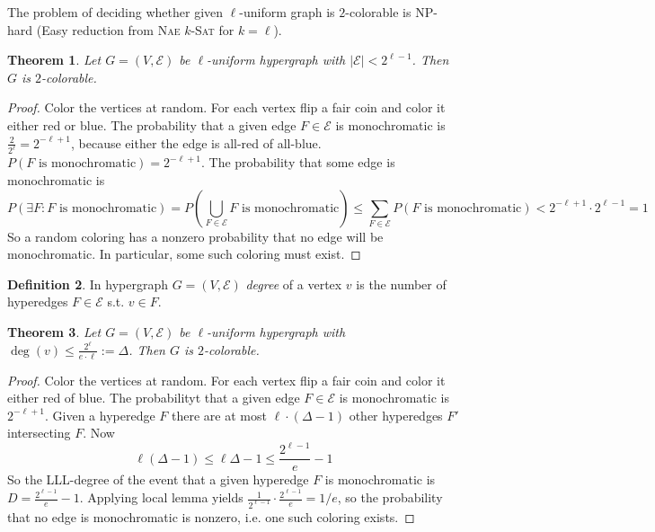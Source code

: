 \documentclass{article}
\theoremstyle{plain}
\newtheorem{thm}{Theorem}[section]
\theoremstyle{definition}
\newtheorem{defn}[thm]{Definition}
\newcommand{\naekSAT}{\textsc{Nae $k$-Sat}\xspace}
\newcommand{\NP}{\textsf{NP}\xspace}
\begin{document}
The problem of deciding whether given $\ell$-uniform graph is $2$-colorable is \NP-hard (Easy reduction from \naekSAT for $k=\ell$).

\begin{thm}
	Let $G=(V,\mathcal{E})$ be $\ell$-uniform hypergraph with $|\mathcal{E}|<2^{\ell - 1}$. Then $G$ is $2$-colorable.
\end{thm}
\begin{proof}
	Color the vertices at random. For each vertex flip a fair coin and color it either red or blue. The probability that a given edge $F\in \mathcal{E}$ is monochromatic is $\frac{2}{2^{\ell}}=2^{-\ell+1}$, because either the edge is all-red of all-blue. $P(F \text{ is monochromatic})=2^{-\ell +1}$. The probability that some edge is monochromatic is
	$$
	P(\exists F: F\text{ is monochromatic})=P(\bigcup_{F\in \mathcal{E}}{F \text{ is monochromatic}})\leq \sum_{F\in\mathcal{E}}P(F \text{ is monochromatic})<2^{-\ell + 1}\cdot 2^{\ell - 1} = 1 
	$$
	So a random coloring has a nonzero probability that no edge will be monochromatic. In particular, some such coloring must exist.
\end{proof}
\begin{defn}
	In hypergraph $G=(V,\mathcal{E})$ \textit{degree} of a vertex $v$ is the number of hyperedges $F\in\mathcal{E}$ s.t. $v\in F$.
\end{defn}
\begin{thm}
	Let $G=(V,\mathcal{E})$ be $\ell$-uniform hypergraph with $\deg(v)\leq \frac{2^{\ell}}{e\cdot \ell}:=\Delta$. Then $G$ is $2$-colorable.
\end{thm}
\begin{proof}
	Color the vertices  at random. For each vertex flip a fair coin and color it either red of blue. The probabilityt that a given edge $F\in\mathcal{E}$ is monochromatic is $2^{-\ell + 1}$. Given a hyperedge $F$ there are at most $\ell \cdot (\Delta-1)$ other hyperedges $F'$ intersecting $F$. Now
	$$
	\ell (\Delta - 1) \leq \ell \Delta - 1 \leq \frac{2^{\ell - 1}}{e}-1
	$$
	So the LLL-degree of the event that a given hyperedge $F$ is monochromatic is $D= \frac{2^{\ell - 1}}{e}-1$. Applying local lemma yields $\frac{1}{2^{\ell - 1}}\cdot\frac{2^{\ell - 1}}{e}=1/e$, so the probability that no edge is monochromatic is nonzero, i.e. one such coloring exists.
\end{proof}
\end{document}
